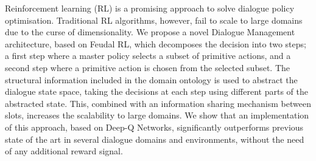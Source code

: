 Reinforcement learning (RL) is a promising approach to solve dialogue policy optimisation. Traditional RL algorithms, however, fail to scale to large domains due to the curse of dimensionality. We propose a novel Dialogue Management architecture, based on Feudal RL, which decomposes the decision into two steps; a first step where a master policy selects a subset of primitive actions, and a second step where a primitive action is chosen from the selected subset. The structural information included in the domain ontology is used to abstract the dialogue state space, taking the decisions at each step using different parts of the abstracted state. This, combined with an information sharing mechanism between slots, increases the scalability to large domains. We show that an implementation of this approach, based on Deep-Q Networks, significantly outperforms previous state of the art in several dialogue domains and environments, without the need of any additional reward signal.
